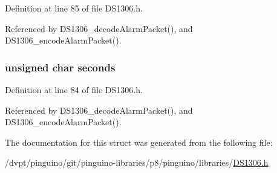 Definition at line 85 of file D\-S1306.\-h.



Referenced by D\-S1306\-\_\-decode\-Alarm\-Packet(), and D\-S1306\-\_\-encode\-Alarm\-Packet().

\hypertarget{structds1306alarm_a173027d8c297c3e800a19ec32217953e}{
\subsubsection[{seconds}]{\setlength{\rightskip}{0pt plus 5cm}unsigned char seconds}}\label{structds1306alarm_a173027d8c297c3e800a19ec32217953e}


Definition at line 84 of file D\-S1306.\-h.



Referenced by D\-S1306\-\_\-decode\-Alarm\-Packet(), and D\-S1306\-\_\-encode\-Alarm\-Packet().



The documentation for this struct was generated from the following file\-:\begin{DoxyCompactItemize}
\item 
/dvpt/pinguino/git/pinguino-\/libraries/p8/pinguino/libraries/\hyperlink{p8_2pinguino_2libraries_2_d_s1306_8h}{D\-S1306.\-h}\end{DoxyCompactItemize}
